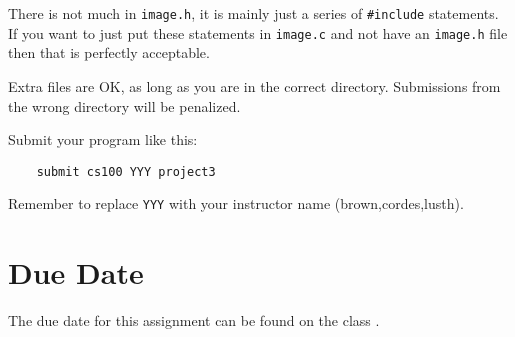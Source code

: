 \documentclass[12pt]{article}
\begin{document}
There is not much in {\tt image.h}, it is mainly just a series of
{\tt \#include} statements.  If you want to just put these statements
in {\tt image.c} and not have an {\tt image.h} file then that is
perfectly acceptable.

Extra files are OK, as long as you are in the correct directory. 
Submissions from the wrong directory
will be penalized.

Submit your program like this:

\begin{verbatim}
    submit cs100 YYY project3
\end{verbatim}

Remember to replace \verb!YYY! with your instructor name
(brown,cordes,lusth).

\section*{Due Date}

The due date for this assignment can be found on the class
.
\end{document}
